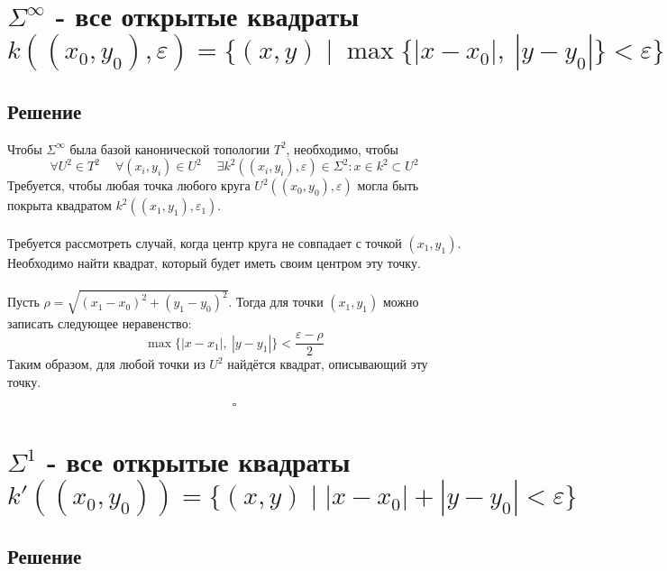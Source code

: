 \documentclass{article}
\begin{document}
        
        \section{ $\Sigma^\infty$ - все открытые квадраты $k((x_0, y_0), \varepsilon) = \{(x, y) \mid \max \{|x - x_0|, \ |y - y_0|\} < \varepsilon \}$}

        
        \subsection{Решение}
        Чтобы $\Sigma^\infty$ была базой канонической топологии $T^2$, необходимо, чтобы
        \[\forall U^2 \in T^2 \ \quad \forall (x_i, y_i) \in U^2 \ \quad \exists k^2((x_i, y_i), \varepsilon) \in \Sigma^2 : x \in k^2 \subset U^2 \]
        Требуется, чтобы любая точка любого круга $U^2((x_0, y_0), \varepsilon)$ могла быть покрыта квадратом $k^2((x_1, y_1), \varepsilon_1)$.\\ \\Требуется рассмотреть случай, когда центр круга не совпадает с точкой $(x_1, y_1)$. Необходимо найти квадрат, который будет иметь своим центром эту точку.\\ \\Пусть $\rho = \sqrt{(x_1 - x_0)^2 + (y_1 - y_0)^2}$.
        Тогда для точки $(x_1, y_1)$ можно записать следующее неравенство:
        \[
        \max \{|x - x_1|, \ |y - y_1|\} < \frac{\varepsilon - \rho}{2}
        \]Таким образом, для любой точки из $U^2$ найдётся квадрат, описывающий эту точку.
        
        \[
        \square
        \]

        \section{ $\Sigma^1$ - все открытые квадраты $k'((x_0, y_0)) = \{(x, y) \mid |x - x_0| + |y - y_0| < \varepsilon \}$}

        \subsection{Решение}
\end{document}
